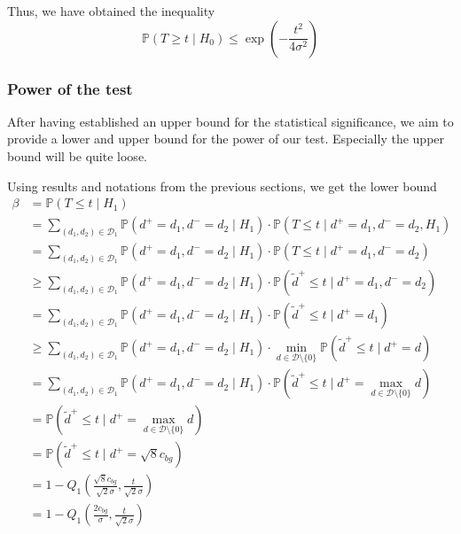 \documentclass[a4paper,12pt]{article}
\theoremstyle{plain}
\theoremstyle{definition}
\theoremstyle{remark}
\begin{document}
Thus, we have obtained the inequality
\begin{equation}
	\mathbb{P}(T \geq t \mid H_0) \leq \exp \left( - \frac{t^2}{4 \sigma^2} \right)
\end{equation}

\subsubsection{Power of the test}
After having established an upper bound for the statistical significance, we aim to provide a lower and upper bound for the power of our test. Especially the upper bound will be quite loose.

Using results and notations from the previous sections, we get the lower bound
\begin{align*}
	\beta &= \mathbb{P}(T \leq t \mid H_1) \\
	&= \sum_{(d_1, d_2) \in \mathcal{D}_1} \mathbb{P}(d^+ = d_1, d^- = d_2 \mid H_1) \cdot \mathbb{P}(T \leq t \mid d^+ = d_1, d^- = d_2, H_1) \\
	&= \sum_{(d_1, d_2) \in \mathcal{D}_1} \mathbb{P}(d^+ = d_1, d^- = d_2 \mid H_1) \cdot \mathbb{P}(T \leq t \mid d^+ = d_1, d^- = d_2) \\
	&\geq \sum_{(d_1, d_2) \in \mathcal{D}_1} \mathbb{P}(d^+ = d_1, d^- = d_2 \mid H_1) \cdot \mathbb{P}(\tilde{d}^+ \leq t \mid d^+ = d_1, d^- = d_2) \\
	&= \sum_{(d_1, d_2) \in \mathcal{D}_1} \mathbb{P}(d^+ = d_1, d^- = d_2 \mid H_1) \cdot \mathbb{P}(\tilde{d}^+ \leq t \mid d^+ = d_1) \\
	&\geq \sum_{(d_1, d_2) \in \mathcal{D}_1} \mathbb{P}(d^+ = d_1, d^- = d_2 \mid H_1) \cdot \min_{d \in \mathcal{D} \setminus \{ 0 \}} \mathbb{P}(\tilde{d}^+ \leq t \mid d^+ = d) \\
	&= \sum_{(d_1, d_2) \in \mathcal{D}_1} \mathbb{P}(d^+ = d_1, d^- = d_2 \mid H_1) \cdot \mathbb{P}(\tilde{d}^+ \leq t \mid d^+ = \max_{d \in \mathcal{D} \setminus \{ 0 \}} d) \\
	&= \mathbb{P}(\tilde{d}^+ \leq t \mid d^+ = \max_{d \in \mathcal{D} \setminus \{ 0 \}} d) \\
	&= \mathbb{P}(\tilde{d}^+ \leq t \mid d^+ = \sqrt{8} c_{bg}) \\
	&= 1 - Q_1 \left( \frac{\sqrt{8} c_{bg}}{\sqrt{2} \sigma}, \frac{t}{\sqrt{2} \sigma} \right) \\
	&= 1 - Q_1 \left( \frac{2 c_{bg}}{\sigma}, \frac{t}{\sqrt{2} \sigma} \right)
\end{align*}
\end{document}
